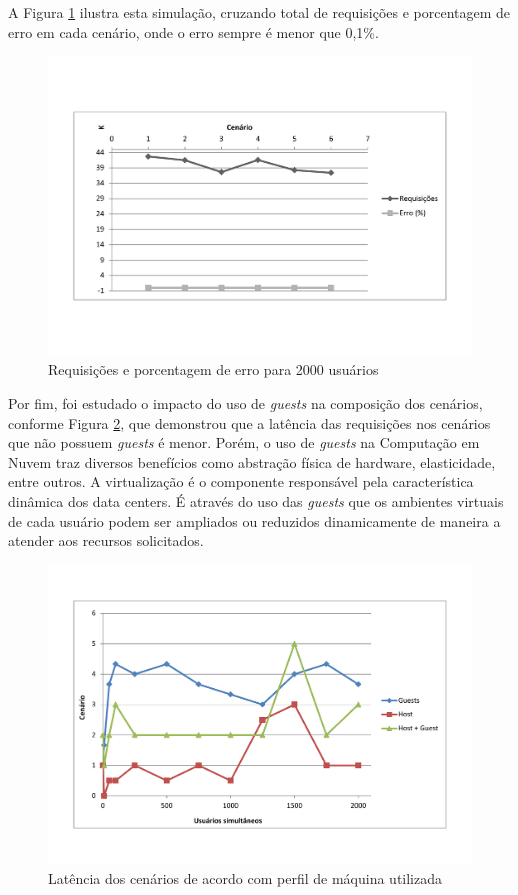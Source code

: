 A Figura \ref{fig:max} ilustra esta simulação, cruzando total de requisições e porcentagem de erro em cada cenário, onde o erro sempre é menor que 0,1\%.    

    \begin{figure}[H]
    \centering
    \includegraphics[scale=0.5]{imagens/reqXerro.pdf}
    \caption{Requisições e porcentagem de erro para 2000 usuários}
    \label{fig:max}
    \end{figure}

Por fim, foi estudado o impacto do uso de \textit{guests} na composição dos cenários, conforme Figura \ref{fig:lat}, que demonstrou que a latência das requisições nos cenários que não possuem \textit{guests} é menor. Porém, o uso de \textit{guests} na Computação em Nuvem traz diversos benefícios como abstração física de hardware, elasticidade, entre outros. A virtualização é o componente responsável pela característica dinâmica dos data centers. É através do uso das \textit{guests} que os ambientes virtuais de cada usuário podem ser ampliados ou reduzidos dinamicamente de maneira a atender aos recursos solicitados.  

    \begin{figure}[H]
    \centering
    \includegraphics[scale=0.5]{imagens/latencia.pdf}
    \caption{Latência dos cenários de acordo com perfil de máquina utilizada}
    \label{fig:lat}
    \end{figure}

